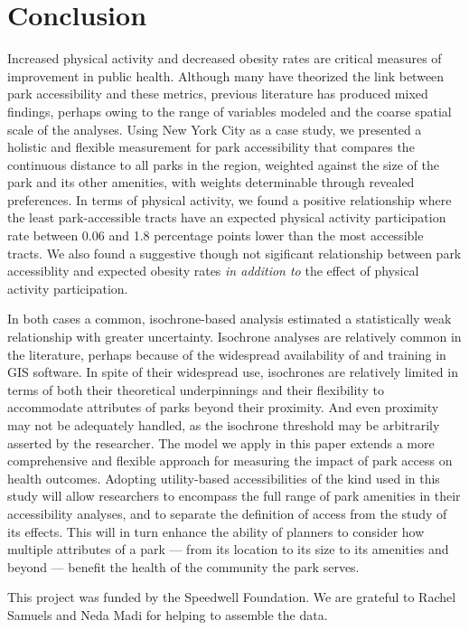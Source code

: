 \documentclass[shortAfour,sageh.bst]{sagej}
\begin{document}
\hypertarget{conclusion}{%
\section{Conclusion}\label{conclusion}}

Increased physical activity and decreased obesity rates are critical
measures of improvement in public health. Although many have theorized
the link between park accessibility and these metrics, previous
literature has produced mixed findings, perhaps owing to the range of
variables modeled and the coarse spatial scale of the analyses. Using
New York City as a case study, we presented a holistic and flexible
measurement for park accessibility that compares the continuous distance
to all parks in the region, weighted against the size of the park and
its other amenities, with weights determinable through revealed
preferences. In terms of physical activity, we found a positive
relationship where the least park-accessible tracts have an expected
physical activity participation rate between 0.06 and 1.8 percentage
points lower than the most accessible tracts. We also found a suggestive
though not sigificant relationship between park accessiblity and
expected obesity rates \emph{in addition to} the effect of physical
activity participation.

In both cases a common, isochrone-based analysis estimated a
statistically weak relationship with greater uncertainty. Isochrone
analyses are relatively common in the literature, perhaps because of the
widespread availability of and training in GIS software. In spite of
their widespread use, isochrones are relatively limited in terms of both
their theoretical underpinnings and their flexibility to accommodate
attributes of parks beyond their proximity. And even proximity may not
be adequately handled, as the isochrone threshold may be arbitrarily
asserted by the researcher. The model we apply in this paper extends a
more comprehensive and flexible approach for measuring the impact of
park access on health outcomes. Adopting utility-based accessibilities
of the kind used in this study will allow researchers to encompass the
full range of park amenities in their accessibility analyses, and to
separate the definition of access from the study of its effects. This
will in turn enhance the ability of planners to consider how multiple
attributes of a park --- from its location to its size to its amenities
and beyond --- benefit the health of the community the park serves.

\begin{acks}
This project was funded by the Speedwell Foundation. We are grateful to Rachel
Samuels and Neda Madi for helping to assemble the data.
\end{acks}
\end{document}
